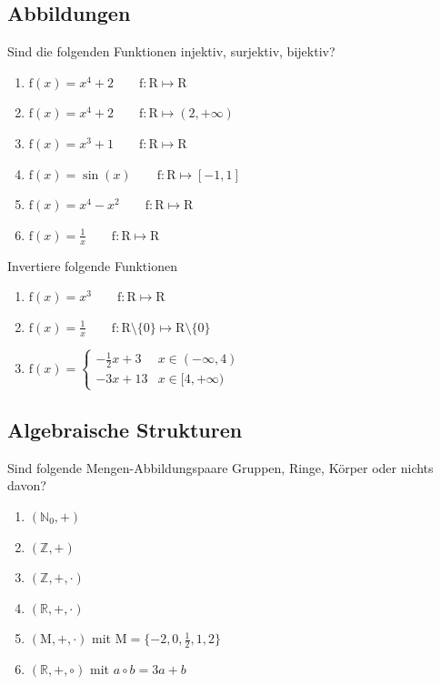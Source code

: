 \documentclass[11pt, a4paper]{article}
\begin{document}
\subsection{Abbildungen}
Sind die folgenden Funktionen injektiv, surjektiv, bijektiv?
\begin{enumerate}
	\item $\mathrm{f}(x) = x^4+2 \qquad \mathrm{f}: \mathrm{R} \mapsto \mathrm{R}$
	\item $\mathrm{f}(x) = x^4+2 \qquad \mathrm{f}: \mathrm{R} \mapsto (2, + \infty)$
	\item $\mathrm{f}(x) = x^3+1 \qquad \mathrm{f}: \mathrm{R} \mapsto \mathrm{R}$
	\item $\mathrm{f}(x) = \sin(x) \qquad \mathrm{f}: \mathrm{R} \mapsto [-1, 1]$
	\item $\mathrm{f}(x) = x^4 - x^2 \qquad \mathrm{f}: \mathrm{R} \mapsto \mathrm{R}$
	\item $\mathrm{f}(x) = \frac{1}{x} \qquad \mathrm{f}: \mathrm{R} \mapsto \mathrm{R}$
\end{enumerate}
Invertiere folgende Funktionen
\begin{enumerate}
	\item $\mathrm{f}(x) = x^3 \qquad \mathrm{f}: \mathrm{R} \mapsto \mathrm{R}$
	\item $\mathrm{f}(x) = \frac{1}{x} \qquad \mathrm{f}: \mathrm{R} \setminus \{0\} \mapsto \mathrm{R} \setminus \{0\}$
	\item $\mathrm{f}(x) =
		\begin{cases}
			- \frac{1}{2}x + 3 & x \in (-\infty, 4) \\
			- 3x + 13 & x \in [4, +\infty)
		\end{cases}
		$
\end{enumerate}

\subsection{Algebraische Strukturen}
Sind folgende Mengen-Abbildungspaare Gruppen, Ringe, Körper oder nichts davon?
\begin{enumerate}
	\item $\left( \mathbb{N}_0, + \right)$
	\item $\left( \mathbb{Z}, + \right)$
	\item $\left( \mathbb{Z}, +, \cdot \right)$
	\item $\left( \mathbb{R}, +, \cdot \right)$
	\item $\left( \mathrm{M}, +, \cdot \right)$ mit $\mathrm{M} = \{ -2,0,\frac{1
	}{2},1,2 \}$
	\item $\left( \mathbb{R}, +, \circ \right)$ mit $a \circ b = 3a + b$
\end{enumerate}
\end{document}
